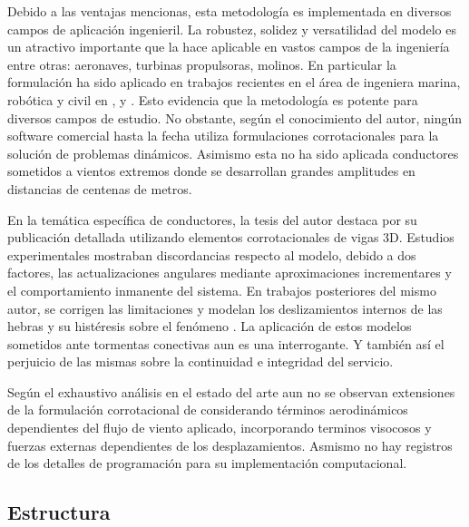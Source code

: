 Debido a las ventajas mencionas, esta metodología es implementada en diversos campos de aplicación ingenieril. La robustez, solidez y versatilidad del modelo es un atractivo importante que la hace aplicable en vastos campos de la ingeniería entre otras: aeronaves, turbinas propulsoras, molinos. En particular la formulación \citep{Le2014}  ha sido aplicado en trabajos recientes en el área de ingeniera marina, robótica y civil en \citep{albino2018co}, \cite{asadi2019multibody} y \cite{viana2020formulation}. Esto evidencia que la metodología es potente para diversos campos de estudio. No obstante, según el conocimiento del autor, ningún software comercial hasta la fecha utiliza formulaciones corrotacionales para la solución de problemas dinámicos. Asimismo esta no ha sido aplicada conductores sometidos a vientos extremos donde se desarrollan grandes amplitudes en distancias de centenas de metros.

En la temática específica de conductores, la tesis del autor \citet{foti2013corotational} destaca por su publicación detallada utilizando elementos corrotacionales de vigas 3D. Estudios experimentales mostraban discordancias respecto al modelo, debido a dos factores, las actualizaciones angulares mediante aproximaciones incrementares y el comportamiento inmanente del sistema. En trabajos posteriores del mismo autor, se corrigen las limitaciones y modelan los deslizamientos internos de las hebras y su histéresis sobre el fenómeno \citet{foti2018finite}. La aplicación de estos modelos sometidos ante tormentas conectivas aun es una interrogante. Y también así el perjuicio de las mismas sobre la continuidad e integridad del servicio. 

Según el exhaustivo análisis en el estado del arte aun no se observan extensiones de la formulación corrotacional de \cite{Le2014} considerando términos aerodinámicos dependientes del flujo de viento aplicado, incorporando terminos visocosos y fuerzas externas dependientes de los desplazamientos. Asmismo no hay registros de los detalles de programación para su implementación computacional.

\subsection{Estructura}

